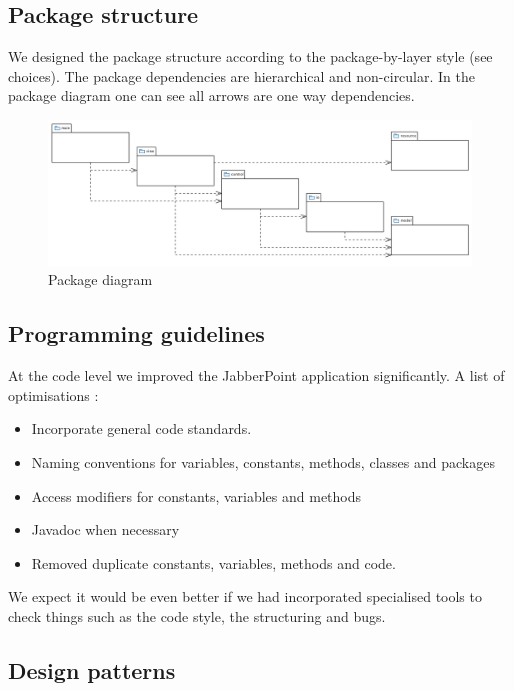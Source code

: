 \documentclass[a4paper]{article}
\begin{document}
\subsection{Package structure}
We designed the package structure according to the package-by-layer style (see choices).
The package dependencies are hierarchical and non-circular. In the package diagram one can see all arrows are one way dependencies.

\begin{figure}[!htpb]
  \includegraphics[width=\linewidth]{JabberPointPackageDiagram.png}
  \caption{Package diagram}
  \label{fig:packdiag}
\end{figure}


\subsection{Programming guidelines}
At the code level we improved the JabberPoint application significantly.
A list of optimisations :
\begin{itemize} 
\item Incorporate general code standards.
\item Naming conventions for variables, constants, methods, classes and packages
\item Access modifiers for constants, variables and methods 
\item Javadoc when necessary
\item Removed duplicate constants, variables, methods and code.
\end{itemize} 
We expect it would be even better if we had incorporated specialised tools to check things such as the code style, the structuring and bugs. 

\subsection{Design patterns}
\end{document}
